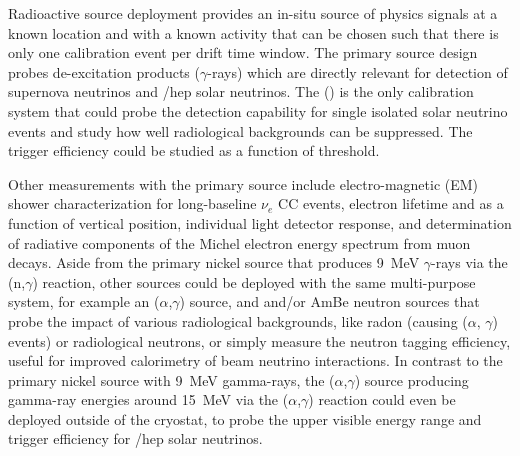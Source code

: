 


Radioactive source deployment provides an in-situ source of physics signals at a known location and with a known activity that can be chosen such that there is only one calibration event per drift time window. The 
primary
source design probes de-excitation products ($\gamma$-rays) which are directly relevant for detection of supernova neutrinos and /hep solar neutrinos. The  () is the only calibration system that could probe the detection capability for single isolated solar neutrino events and study how well radiological backgrounds can be suppressed. The trigger efficiency could be studied as a function of threshold. 

Other measurements with the primary source include electro-magnetic (EM) shower characterization for long-baseline $\nu_e$ CC events, electron lifetime and \efield as a function of  vertical position, individual light detector response, and determination of radiative components of the Michel electron energy spectrum from muon decays. Aside from the 
primary nickel source that produces \SI{9}{\MeV} $\gamma$-rays via the (n,$\gamma$) reaction, other sources could be deployed with the same multi-purpose system, for example an ($\alpha$,$\gamma$)
source, and  and/or AmBe neutron sources that probe the impact of various radiological backgrounds, like radon (causing  ($\alpha,\,\gamma$) events) or radiological neutrons, or simply measure the neutron tagging efficiency, useful for improved calorimetry of beam neutrino interactions. In contrast to the primary %
nickel source with \SI{9}{\MeV} gamma-rays, the ($\alpha$,$\gamma$) source producing gamma-ray energies around \SI{15}{\MeV} via the
($\alpha$,$\gamma$)
reaction could even be deployed outside of the cryostat, to probe the upper visible energy range and trigger efficiency for /hep solar neutrinos. 

